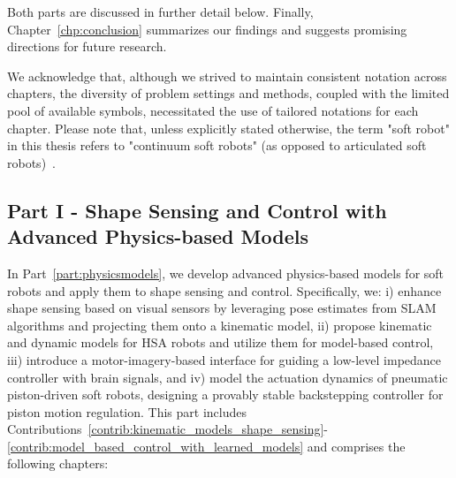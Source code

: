 Both parts are discussed in further detail below. Finally, Chapter~\ref{chp:conclusion} summarizes our findings and suggests promising directions for future research.

We acknowledge that, although we strived to maintain consistent notation across chapters, the diversity of problem settings and methods, coupled with the limited pool of available symbols, necessitated the use of tailored notations for each chapter.
Please note that, unless explicitly stated otherwise, the term "soft robot" in this thesis refers to "continuum soft robots" (as opposed to articulated soft robots)~\citep{della2020softencyclopedia}.

\subsection*{Part I - Shape Sensing and Control with Advanced Physics-based Models}

In Part~\ref{part:physicsmodels}, we develop advanced physics-based models for soft robots and apply them to shape sensing and control. Specifically, we: i) enhance shape sensing based on visual sensors by leveraging pose estimates from \gls{SLAM} algorithms and projecting them onto a kinematic model, ii) propose kinematic and dynamic models for \gls{HSA} robots and utilize them for model-based control, iii) introduce a motor-imagery-based  interface for guiding a low-level impedance controller with brain signals, and iv) model the actuation dynamics of pneumatic piston-driven soft robots, designing a provably stable backstepping controller for piston motion regulation.
%
This part includes Contributions~\ref{contrib:kinematic_models_shape_sensing}-\ref{contrib:model_based_control_with_learned_models} and comprises the following chapters:

